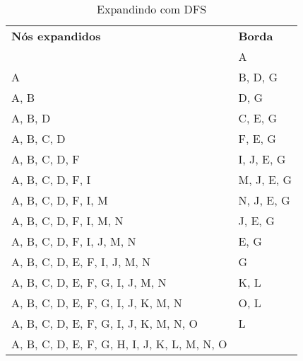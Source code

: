 \documentclass[12pt,letterpaper]{article}
\begin{document}
	\begin{table}[]
		\centering
		\caption{Expandindo com DFS}
		\label{my-label}
		\begin{tabular}{l|l}
			\textbf{Nós expandidos}                      & \textbf{Borda} \\ \cline{1-2}
			                                             & A              \\ \cline{1-2}
			A                                            & B, D, G        \\ \cline{1-2}
			A, B                                         & D, G           \\ \cline{1-2}
			A, B, D                                      & C, E, G        \\ \cline{1-2}
			A, B, C, D                                   & F, E, G        \\ \cline{1-2}
			A, B, C, D, F                                & I, J, E, G     \\ \cline{1-2}
			A, B, C, D, F, I                             & M, J, E, G     \\ \cline{1-2}
			A, B, C, D, F, I, M                          & N, J, E, G     \\ \cline{1-2}
			A, B, C, D, F, I, M, N                       & J, E, G        \\ \cline{1-2}
			A, B, C, D, F, I, J, M, N                    & E, G           \\ \cline{1-2}
			A, B, C, D, E, F, I, J, M, N                 & G              \\ \cline{1-2}
			A, B, C, D, E, F, G, I, J, M, N              & K, L           \\ \cline{1-2}
			A, B, C, D, E, F, G, I, J, K, M, N           & O, L           \\ \cline{1-2}
			A, B, C, D, E, F, G, I, J, K, M, N, O        & L              \\ \cline{1-2}
			A, B, C, D, E, F, G, H, I, J, K, L, M, N, O  &                \\
		\end{tabular}
	\end{table}
			 
\end{document}
